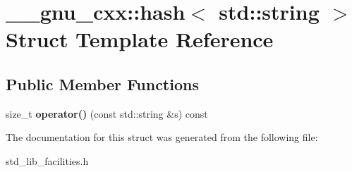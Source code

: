 \hypertarget{struct____gnu__cxx_1_1hash_3_01std_1_1string_01_4}{\section{\-\_\-\-\_\-gnu\-\_\-cxx\-:\-:hash$<$ std\-:\-:string $>$ Struct Template Reference}
\label{struct____gnu__cxx_1_1hash_3_01std_1_1string_01_4}
}
\subsection*{Public Member Functions}
\begin{DoxyCompactItemize}
\item 
\hypertarget{struct____gnu__cxx_1_1hash_3_01std_1_1string_01_4_af1cbecea149377151f9f3e4e3ff9b0f0}{size\-\_\-t {\bfseries operator()} (const std\-::string \&s) const }\label{struct____gnu__cxx_1_1hash_3_01std_1_1string_01_4_af1cbecea149377151f9f3e4e3ff9b0f0}

\end{DoxyCompactItemize}


The documentation for this struct was generated from the following file\-:\begin{DoxyCompactItemize}
\item 
std\-\_\-lib\-\_\-facilities.\-h\end{DoxyCompactItemize}
